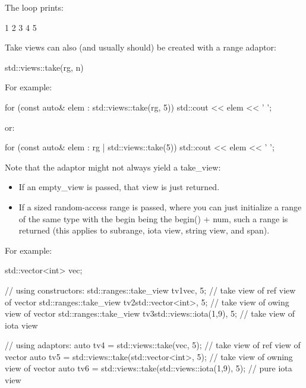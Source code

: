 The loop prints:

\begin{shell}
1 2 3 4 5
\end{shell}


Take views can also (and usually should) be created with a range adaptor:

\begin{cpp}
std::views::take(rg, n)
\end{cpp}

For example:

\begin{cpp}
for (const auto& elem : std::views::take(rg, 5)) {
	std::cout << elem << ' ';
}
\end{cpp}

or:

\begin{cpp}
for (const auto& elem : rg | std::views::take(5)) {
	std::cout << elem << ' ';
}
\end{cpp}

Note that the adaptor might not always yield a take\_view:

\begin{itemize}
\item
If an empty\_view is passed, that view is just returned.

\item
If a sized random-access range is passed, where you can just initialize a range of the same type with the begin being the begin() + num, such a range is returned (this applies to subrange, iota view, string view, and span).
\end{itemize}

For example:

\begin{cpp}
std::vector<int> vec;

// using constructors:
std::ranges::take_view tv1{vec, 5}; // take view of ref view of vector
std::ranges::take_view tv2{std::vector<int>{}, 5}; // take view of owing view of vector
std::ranges::take_view tv3{std::views::iota(1,9), 5}; // take view of iota view

// using adaptors:
auto tv4 = std::views::take(vec, 5); // take view of ref view of vector
auto tv5 = std::views::take(std::vector<int>{}, 5); // take view of owning view of vector
auto tv6 = std::views::take(std::views::iota(1,9), 5); // pure iota view
\end{cpp}

